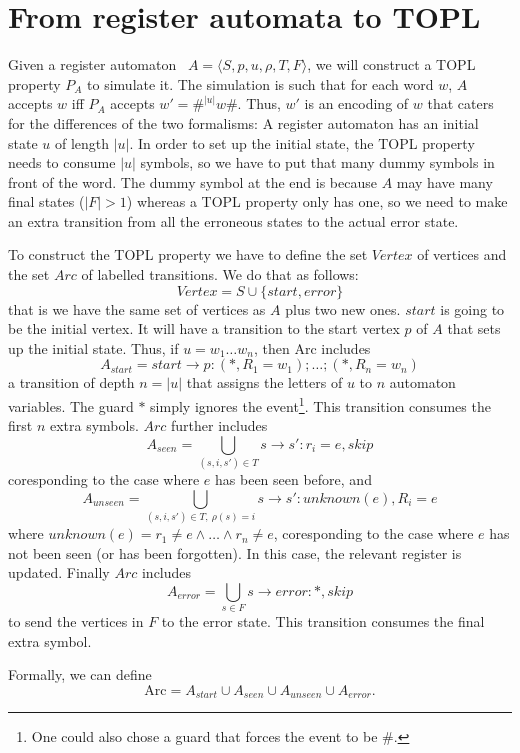 \section{From register automata to TOPL}
Given a register automaton~\cite{dblp:journals/tcs/kaminskif94} $A=\langle S, p, u, \rho, T,
F\rangle$, we will construct a TOPL property $P_A$ to simulate it. The
simulation is such that for each word $w$, $A$ accepts $w$ iff $P_A$
accepts $w' = \#^{|u|}w\#$.  Thus, $w'$ is an encoding of $w$ that
caters for the differences of the two formalisms: A register automaton has an
initial state $u$ of length $|u|$. In order to set up the initial
state, the TOPL property needs to consume $|u|$ symbols, so we have to
put that many dummy symbols in front of the word. The dummy symbol at
the end is because $A$ may have many final states ($|F| > 1$) whereas a TOPL
property only has one, so we need to make an extra transition from all
the erroneous states to the actual error state.

\newcommand{\Vertex}{\mathit{Vertex}}
\newcommand{\Arc}{\mathit{Arc}}
To construct the TOPL property we have to define the set $\Vertex$
of vertices and the set $\Arc$ of labelled transitions. We do that as follows:
\[
\Vertex = S \cup \{start, error\}
\]
that is we have the same set of vertices as $A$ plus two new
ones. $start$ is going to be the initial vertex. It will have a
transition to the start vertex $p$ of $A$ that sets up the
initial state. Thus, if $u = w_1\ldots w_n$, then Arc includes
\[
A_{start} = start \to p: (*,R_1=w_1);\ldots;(*,R_n=w_n)
\]
a transition of depth $n = |u|$ that assigns the letters of $u$
to $n$ automaton variables. The guard $*$ simply ignores the
event\footnote{One could also chose a guard that forces the event
to be \#.}. This transition consumes the first $n$ extra
symbols. $\Arc$ further includes
\[
A_{seen} = \bigcup_{(s, i, s') \in T} s\to s': r_i=e, skip
\]
coresponding to the case where $e$ has been seen before, and
\[
A_{unseen} = \bigcup_{(s, i, s') \in T,\ \rho(s)=i} s\to s': unknown(e), R_i=e
\]
where $unknown(e) = r_1 \neq e \land \ldots \land r_n \neq e$,
coresponding to the case where $e$ has not been seen (or has been
forgotten). In this case, the relevant register is
updated. Finally $\Arc$ includes
\[
A_{error} = \bigcup_{s\in F} s\to error: *, skip
\]
to send the vertices in $F$ to the error state. This transition
consumes the final extra symbol.

Formally, we can define
\[
\mathrm{Arc} = A_{start} \cup A_{seen} \cup A_{unseen} \cup A_{error}.
\]

